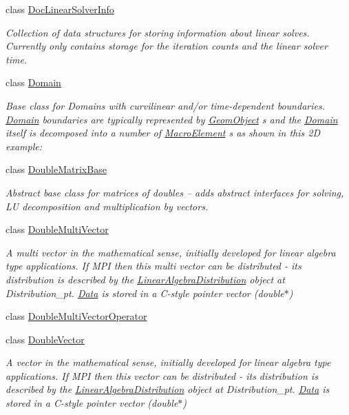 \begin{DoxyCompactItemize}
class \hyperlink{classoomph_1_1DocLinearSolverInfo}{Doc\+Linear\+Solver\+Info}
\begin{DoxyCompactList}\small\item\em Collection of data structures for storing information about linear solves. Currently only contains storage for the iteration counts and the linear solver time. \end{DoxyCompactList}\item 
class \hyperlink{classoomph_1_1Domain}{Domain}
\begin{DoxyCompactList}\small\item\em Base class for Domains with curvilinear and/or time-\/dependent boundaries. \hyperlink{classoomph_1_1Domain}{Domain} boundaries are typically represented by \hyperlink{classoomph_1_1GeomObject}{Geom\+Object} s and the \hyperlink{classoomph_1_1Domain}{Domain} itself is decomposed into a number of \hyperlink{classoomph_1_1MacroElement}{Macro\+Element} s as shown in this 2D example\+: \end{DoxyCompactList}\item 
class \hyperlink{classoomph_1_1DoubleMatrixBase}{Double\+Matrix\+Base}
\begin{DoxyCompactList}\small\item\em Abstract base class for matrices of doubles -- adds abstract interfaces for solving, LU decomposition and multiplication by vectors. \end{DoxyCompactList}\item 
class \hyperlink{classoomph_1_1DoubleMultiVector}{Double\+Multi\+Vector}
\begin{DoxyCompactList}\small\item\em A multi vector in the mathematical sense, initially developed for linear algebra type applications. If M\+PI then this multi vector can be distributed -\/ its distribution is described by the \hyperlink{classoomph_1_1LinearAlgebraDistribution}{Linear\+Algebra\+Distribution} object at Distribution\+\_\+pt. \hyperlink{classoomph_1_1Data}{Data} is stored in a C-\/style pointer vector (double$\ast$) \end{DoxyCompactList}\item 
class \hyperlink{classoomph_1_1DoubleMultiVectorOperator}{Double\+Multi\+Vector\+Operator}
\item 
class \hyperlink{classoomph_1_1DoubleVector}{Double\+Vector}
\begin{DoxyCompactList}\small\item\em A vector in the mathematical sense, initially developed for linear algebra type applications. If M\+PI then this vector can be distributed -\/ its distribution is described by the \hyperlink{classoomph_1_1LinearAlgebraDistribution}{Linear\+Algebra\+Distribution} object at Distribution\+\_\+pt. \hyperlink{classoomph_1_1Data}{Data} is stored in a C-\/style pointer vector (double$\ast$) \end{DoxyCompactList}\item 

\end{DoxyCompactItemize}
